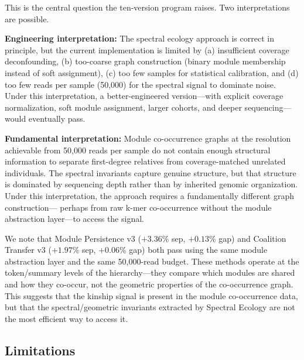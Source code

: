 \documentclass{../yalumba}
\begin{document}
This is the central question the ten-version program raises.  Two
interpretations are possible.

\textbf{Engineering interpretation:} The spectral ecology approach
is correct in principle, but the current implementation is limited by
(a) insufficient coverage deconfounding, (b) too-coarse graph construction
(binary module membership instead of soft assignment), (c) too few
samples for statistical calibration, and (d) too few reads per sample
(50{,}000) for the spectral signal to dominate noise.  Under this
interpretation, a better-engineered version---with explicit coverage
normalization, soft module assignment, larger cohorts, and deeper
sequencing---would eventually pass.

\textbf{Fundamental interpretation:} Module co-occurrence graphs at
the resolution achievable from 50{,}000 reads per sample do not contain
enough structural information to separate first-degree relatives from
coverage-matched unrelated individuals.  The spectral invariants capture
genuine structure, but that structure is dominated by sequencing depth
rather than by inherited genomic organization.  Under this interpretation,
the approach requires a fundamentally different graph construction---
perhaps from raw k-mer co-occurrence without the module abstraction
layer---to access the signal.


We note that Module Persistence v3 ($+3.36\%$ sep, $+0.13\%$ gap)
and Coalition Transfer v3 ($+1.97\%$ sep, $+0.06\%$ gap) both pass
using the same module abstraction layer and the same 50{,}000-read
budget.  These methods operate at the token/summary levels of the
hierarchy---they compare which modules are shared and how they
co-occur, not the geometric properties of the co-occurrence graph.
This suggests that the kinship signal is present in the module
co-occurrence data, but that the spectral/geometric invariants
extracted by Spectral Ecology are not the most efficient way to
access it.

\subsection{Limitations}
\end{document}
